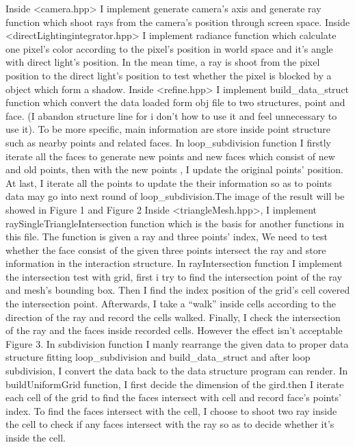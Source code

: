 \documentclass[acmtog]{acmart}
\begin{document}
Inside <camera.hpp> I implement generate camera’s axis and generate ray function which shoot rays from the camera’s position through screen space.
Inside <directLightingintegrator.hpp> I implement radiance function which calculate one pixel’s color according to the pixel’s position in world space and it’s angle with direct light’s position.
In the mean time, a ray is shoot from the pixel position to the direct light’s position to test whether the pixel is blocked by a object which form a shadow.
Inside <refine.hpp> I implement build_data_struct function which convert the data loaded form obj file to two structures, point and face.
(I abandon structure line for i don’t how to use it and feel unnecessary to use it). To be more specific, main information are store inside point structure such as nearby points and related faces.
In loop_subdivision function I firstly iterate all the faces to generate new points and new faces which consist of new and old points, then with the new points , I update the original points’ position.
At last, I iterate all the points to update the their information so as to points data may go into next round of loop_subdivision.The image of the result will be showed in Figure 1 and Figure 2
Inside <triangleMesh.hpp>, I implement raySingleTriangleIntersection function which is the basis for another functions in this file. The function is given a ray and three points’ index,
We need to test whether the face consist of the given three points intersect the ray and store information in the interaction structure.
In rayIntersection function I implement the intersection test with grid, first i try to find the intersection point of the ray and mesh’s bounding box.
Then I find the index position of the grid’s cell covered the intersection point.
Afterwards, I take a “walk” inside cells according to the direction of the ray and record the cells walked. Finally, I check the intersection of the ray and the faces inside recorded cells.
However the effect isn’t acceptable Figure 3.
In subdivision function I manly rearrange the given data to proper data structure fitting loop_subdivision and build_data_struct and after loop subdivision, I convert the data back to the data structure program can render.
In buildUniformGrid function, I first decide the dimension of the gird.then I iterate each cell of the grid to find the faces intersect with cell and record face’s points’ index.
To find the faces intersect with the cell, I choose to shoot two ray inside the cell to check if any faces  intersect with the ray so as to decide whether it’s inside the cell.
\end{document}
